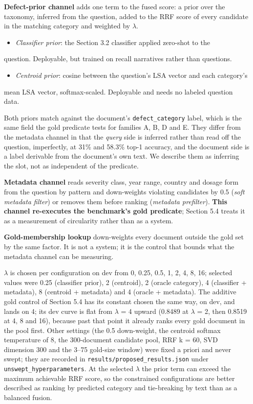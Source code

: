 \documentclass[runningheads]{llncs}
\begin{document}
\textbf{Defect-prior channel} adds one term to the fused score: a prior over the taxonomy, inferred from the question, added to the RRF score of every candidate in the matching category and weighted by $\lambda$.

\begin{itemize}
\item \textit{Classifier prior}: the Section 3.2 classifier applied zero-shot to the
\end{itemize}

question. Deployable, but trained on recall narratives rather than questions.

\begin{itemize}
\item \textit{Centroid prior}: cosine between the question's LSA vector and each category's
\end{itemize}

mean LSA vector, softmax-scaled. Deployable and needs no labeled question data.

Both priors match against the document's \texttt{defect\_category} label, which is the same field the gold predicate tests for families A, B, D and E. They differ from the metadata channel in that the \textit{query} side is inferred rather than read off the question, imperfectly, at 31\% and 58.3\% top-1 accuracy, and the document side is a label derivable from the document's own text. We describe them as inferring the slot, not as independent of the predicate.

\textbf{Metadata channel} reads severity class, year range, country and dosage form from the question by pattern and down-weights violating candidates by 0.5 (\textit{soft metadata filter}) or removes them before ranking (\textit{metadata prefilter}). \textbf{This channel re-executes the benchmark's gold predicate}; Section 5.4 treats it as a measurement of circularity rather than as a system.

\textbf{Gold-membership lookup} down-weights every document outside the gold set by the same factor. It is not a system; it is the control that bounds what the metadata channel can be measuring.

$\lambda$ is chosen per configuration on dev from {0, 0.25, 0.5, 1, 2, 4, 8, 16}; selected values were 0.25 (classifier prior), 2 (centroid), 2 (oracle category), 4 (classifier + metadata), 8 (centroid + metadata) and 4 (oracle + metadata). The additive gold control of Section 5.4 has its constant chosen the same way, on dev, and lands on 4; its dev curve is flat from $\lambda$ = 4 upward (0.8489 at $\lambda$ = 2, then 0.8519 at 4, 8 and 16), because past that point it already ranks every gold document in the pool first. Other settings (the 0.5 down-weight, the centroid softmax temperature of 8, the 300-document candidate pool, RRF k = 60, SVD dimension 300 and the 3--75 gold-size window) were fixed a priori and never swept; they are recorded in \texttt{results/proposed\_\allowbreak{}results.json} under \texttt{unswept\_hyperparameters}. At the selected $\lambda$ the prior term can exceed the maximum achievable RRF score, so the constrained configurations are better described as ranking by predicted category and tie-breaking by text than as a balanced fusion.
\end{document}
